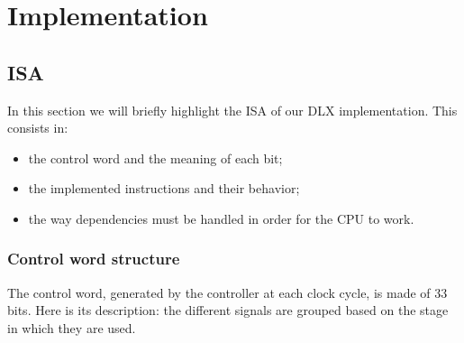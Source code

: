 \chapter{Implementation}\label{Implementation}

\section{ISA}

In this section we will briefly highlight the ISA of our DLX implementation.
This consists in: 
\begin{itemize}
    \item the control word and the meaning of each bit;
\end{itemize}
\begin{itemize}
    \item the implemented instructions and their behavior;
\end{itemize}
\begin{itemize}
    \item the way dependencies must be handled in order for the CPU to work.
\end{itemize}

\subsection{Control word structure}

The control word, generated by the controller at each clock cycle, is made of 33 bits. 
Here is its description: the different signals are grouped based on the stage in which they are used.

